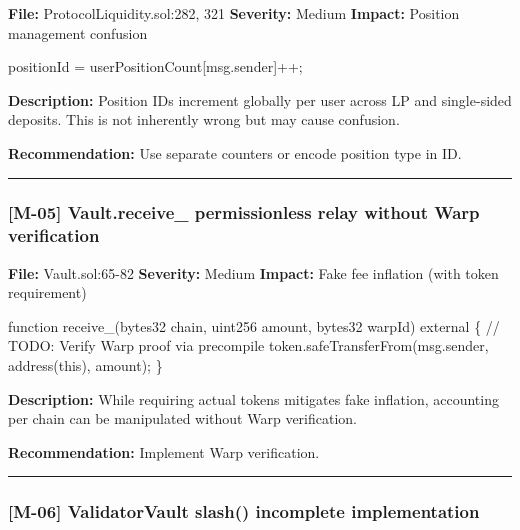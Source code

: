 \documentclass[
]{article}
\newenvironment{Shaded}{}{}
\newcommand{\NormalTok}[1]{#1}
\begin{document}
\textbf{File:} ProtocolLiquidity.sol:282, 321 \textbf{Severity:} Medium
\textbf{Impact:} Position management confusion

\begin{Shaded}
\begin{Highlighting}[]
\NormalTok{positionId = userPositionCount[msg.sender]++;}
\end{Highlighting}
\end{Shaded}

\textbf{Description:} Position IDs increment globally per user across LP
and single-sided deposits. This is not inherently wrong but may cause
confusion.

\textbf{Recommendation:} Use separate counters or encode position type
in ID.

\begin{center}\rule{0.5\linewidth}{0.5pt}\end{center}

\subsubsection{{[}M-05{]} Vault.receive\_ permissionless relay without
Warp
verification}\label{m-05-vaultreceive_-permissionless-relay-without-warp-verification}

\textbf{File:} Vault.sol:65-82 \textbf{Severity:} Medium
\textbf{Impact:} Fake fee inflation (with token requirement)

\begin{Shaded}
\begin{Highlighting}[]
\NormalTok{function receive\_(bytes32 chain, uint256 amount, bytes32 warpId) external \{}
\NormalTok{    // TODO: Verify Warp proof via precompile}
\NormalTok{    token.safeTransferFrom(msg.sender, address(this), amount);}
\NormalTok{\}}
\end{Highlighting}
\end{Shaded}

\textbf{Description:} While requiring actual tokens mitigates fake
inflation, accounting per chain can be manipulated without Warp
verification.

\textbf{Recommendation:} Implement Warp verification.

\begin{center}\rule{0.5\linewidth}{0.5pt}\end{center}

\subsubsection{{[}M-06{]} ValidatorVault slash() incomplete
implementation}\label{m-06-validatorvault-slash-incomplete-implementation}
\end{document}
